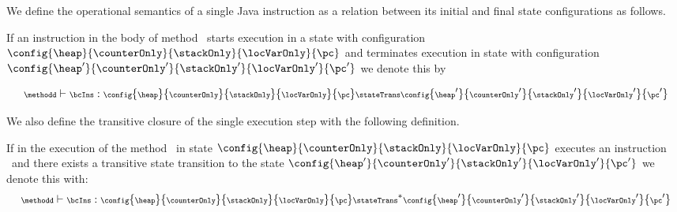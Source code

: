  


 


 We define the operational semantics of a single Java instruction  as a 
 relation between its initial and final state configurations as follows. 


 \begin{StateTransition} \label{stateTrans} 
 If an instruction \bcIns in the body of method \methodd \ starts execution in a state with configuration  
 $\config{ \heap}{\counterOnly}{\stackOnly}{\locVarOnly}{ \pc}$ 
 and terminates execution in state with configuration  $\config{ \heap'}{\counterOnly'}{\stackOnly'}{\locVarOnly'}{\pc'}$ we denote this by

  $$  {\scriptsize \methodd \vdash \bcIns : \config{ \heap}{\counterOnly}{\stackOnly}{\locVarOnly}{ \pc }   \stateTrans \config{ \heap'}{\counterOnly'}{\stackOnly'}{\locVarOnly'}{\pc'} } $$
 \end{StateTransition}

 We also define the transitive closure of the single execution step with the following definition.
 

 \begin{transClosStateTrans0}\label{stateTransit}
 If  in the execution of the method \methodd \ in  state $\config{ \heap}{\counterOnly}{\stackOnly}{\locVarOnly}{\pc}$  executes an instruction \bcIns{} \ and
 there exists  a transitive state transition  to the state $\config{ \heap'}{\counterOnly'}{\stackOnly'}{\locVarOnly'}{\pc'}$ we denote this with:
$$ {\scriptsize \methodd \vdash \bcIns :\config{ \heap}{\counterOnly}{\stackOnly}{\locVarOnly}{\pc} \stateTrans^{*} \config{ \heap'}{\counterOnly'}{\stackOnly'}{\locVarOnly'}{\pc'} } $$ 
\end{transClosStateTrans0}


